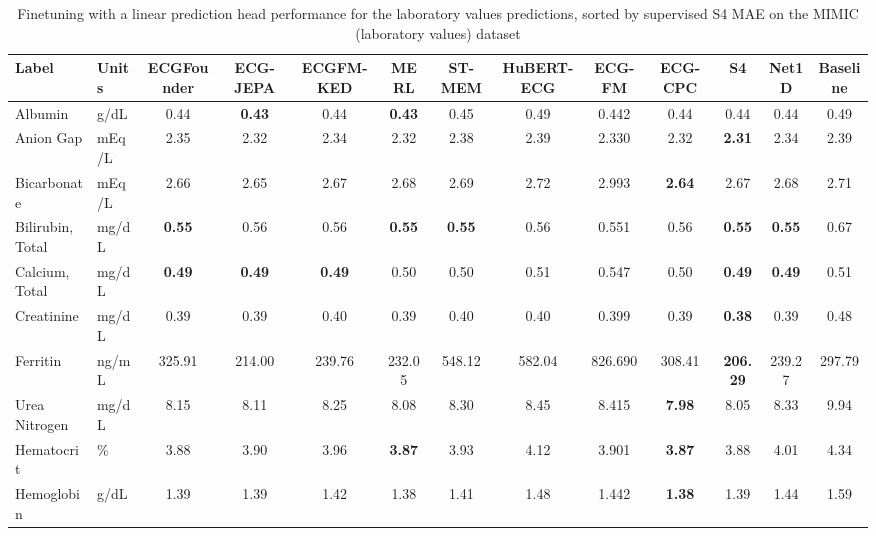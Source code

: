 \documentclass{article}
\begin{document}
                \begin{table}[htbp]
                    \centering
                    \tiny
                    \setlength{\tabcolsep}{2pt}
                    \caption{Finetuning with a linear prediction head performance for the laboratory values predictions, sorted by supervised S4 MAE on the MIMIC (laboratory values) dataset}
                    \begin{tabular}{llccccccccccc}
                        \toprule
                        \textbf{Label} & \textbf{Units} & \textbf{ECGFounder} & \textbf{ECG-JEPA} & \textbf{ECGFM-KED} & \textbf{MERL} & \textbf{ST-MEM} & \textbf{HuBERT-ECG} & \textbf{ECG-FM} & \textbf{ECG-CPC} & \textbf{S4} & \textbf{Net1D} & \textbf{Baseline} \\
                        \midrule
                        Albumin & g/dL & 0.44 & \textbf{0.43} & 0.44 & \textbf{0.43} & 0.45 & 0.49 & 0.442 & 0.44 & 0.44 & 0.44 & 0.49 \\
                        Anion Gap & mEq/L & 2.35 & 2.32 & 2.34 & 2.32 & 2.38 & 2.39 & 2.330 & 2.32 & \textbf{2.31} & 2.34 & 2.39 \\
                        Bicarbonate & mEq/L & 2.66 & 2.65 & 2.67 & 2.68 & 2.69 & 2.72 & 2.993 & \textbf{2.64} & 2.67 & 2.68 & 2.71 \\
                        Bilirubin, Total & mg/dL & \textbf{0.55} & 0.56 & 0.56 & \textbf{0.55} & \textbf{0.55} & 0.56 & 0.551 & 0.56 & \textbf{0.55} & \textbf{0.55} & 0.67 \\
                        Calcium, Total & mg/dL & \textbf{0.49} & \textbf{0.49} & \textbf{0.49} & 0.50 & 0.50 & 0.51 & 0.547 & 0.50 & \textbf{0.49} & \textbf{0.49} & 0.51 \\
                        Creatinine & mg/dL  & 0.39 & 0.39 & 0.40 & 0.39 & 0.40 & 0.40 & 0.399 & 0.39 & \textbf{0.38} & 0.39 & 0.48 \\
                        Ferritin & ng/mL  & 325.91 & 214.00 & 239.76 & 232.05 & 548.12 & 582.04 & 826.690 & 308.41 & \textbf{206.29} & 239.27 & 297.79 \\
                        Urea Nitrogen & mg/dL & 8.15 & 8.11 & 8.25 & 8.08 & 8.30 & 8.45 & 8.415 & \textbf{7.98} & 8.05 & 8.33 & 9.94 \\
                        Hematocrit & \% & 3.88 & 3.90 & 3.96 & \textbf{3.87} & 3.93 & 4.12 & 3.901 & \textbf{3.87} & 3.88 & 4.01 & 4.34 \\
                        Hemoglobin & g/dL & 1.39 & 1.39 & 1.42 & 1.38 & 1.41 & 1.48 & 1.442 & \textbf{1.38} & 1.39 & 1.44 & 1.59 \\

\end{tabular}
\end{table}
\end{document}
